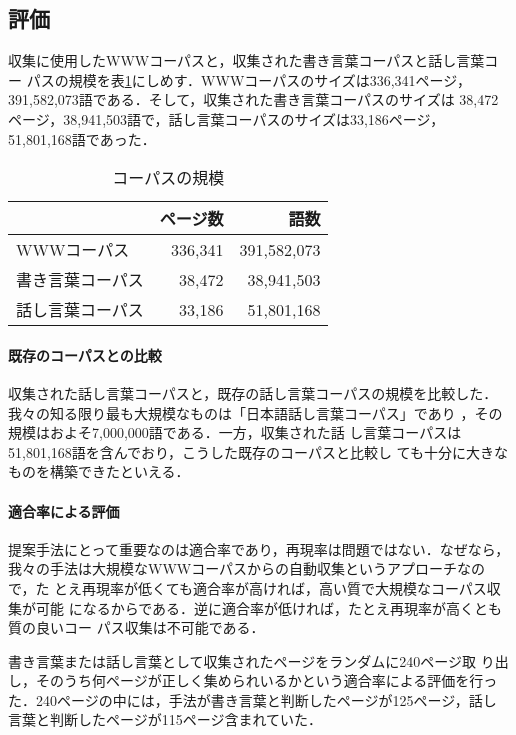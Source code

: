 \documentclass{nlp}
\begin{document}
\subsection{評価}
収集に使用したWWWコーパスと，収集された書き言葉コーパスと話し言葉コー
パスの規模を表\ref{data}にしめす．WWWコーパスのサイズは336,341ページ，
391,582,073語である．そして，収集された書き言葉コーパスのサイズは
38,472ページ，38,941,503語で，話し言葉コーパスのサイズは33,186ページ，
51,801,168語であった．
\begin{table}[h]
 \begin{center}
  \caption{コーパスの規模}
  \label{data}
  \begin{tabular}{lrr}\hline
                      & ページ数  & 語数        \\ \hline
   WWWコーパス        & 336,341   & 391,582,073 \\ \hline
   書き言葉コーパス & 38,472    &  38,941,503 \\
   話し言葉コーパス & 33,186    &  51,801,168 \\ \hline
  \end{tabular}
 \end{center}
\end{table}


\paragraph{既存のコーパスとの比較}
収集された話し言葉コーパスと，既存の話し言葉コーパスの規模を比較した．
我々の知る限り最も大規模なものは「日本語話し言葉コーパス」であり
\cite{Maekawa00}，その規模はおよそ7,000,000語である．一方，収集された話
し言葉コーパスは51,801,168語を含んでおり，こうした既存のコーパスと比較し
ても十分に大きなものを構築できたといえる．


\paragraph{適合率による評価}
提案手法にとって重要なのは適合率であり，再現率は問題ではない．なぜなら，
我々の手法は大規模なWWWコーパスからの自動収集というアプローチなので，た
とえ再現率が低くても適合率が高ければ，高い質で大規模なコーパス収集が可能
になるからである．逆に適合率が低ければ，たとえ再現率が高くとも質の良いコー
パス収集は不可能である．

書き言葉または話し言葉として収集されたページをランダムに240ページ取
り出し，そのうち何ページが正しく集められいるかという適合率による評価を行っ
た．240ページの中には，手法が書き言葉と判断したページが125ページ，話し
言葉と判断したページが115ページ含まれていた．
\end{document}
